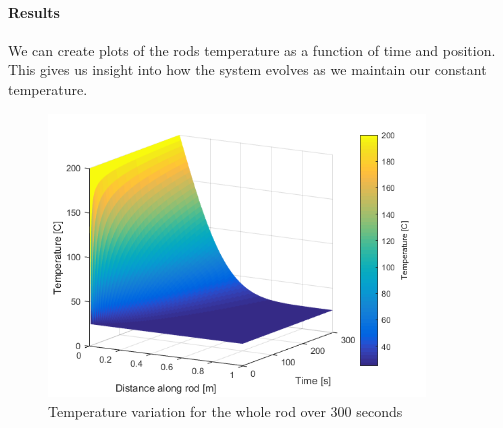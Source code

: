  \paragraph{Results}
\noindent We can create plots of the rods temperature as a function of time and position. This gives us insight into how the system evolves as we maintain our constant temperature. 
\begin{figure}[htb]
	\centering
	\includegraphics[width=10cm]{Figures/Heat1D_1m.png}       
	\caption{Temperature variation for the whole rod over 300 seconds}
	\label{Heat1D_1m.fig}
\end{figure}


